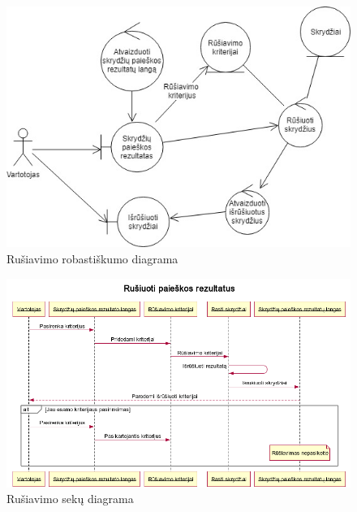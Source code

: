 \documentclass{VUMIFPSkursinis}
\begin{document}
\begin{enumerate}[label=\textbf{U\arabic*}.]
                    \begin{figure}[H]
                        \centering
                        \includegraphics[scale=0.8]{img/ROBsort}
                        \caption{Rušiavimo robastiškumo diagrama}
                        \label{home_page_one_way}
                    \end{figure}

                    \begin{figure}[H]
                        \centering
                        \includegraphics[scale=0.8]{img/seqSort}
                        \caption{Rušiavimo sekų diagrama}
                        \label{home_page_one_way}
                    \end{figure}


\end{enumerate}
\end{document}
